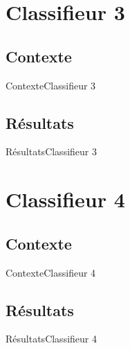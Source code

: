 \documentclass[usenames,dvipsnames]{beamer}
\begin{document}
\section{Classifieur 3}
\subsection{Contexte}
\begin{frame}{Contexte}{Classifieur 3}
\end{frame}

\subsection{Résultats}
\begin{frame}{Résultats}{Classifieur 3}
\end{frame}

\section{Classifieur 4}
\subsection{Contexte}
\begin{frame}{Contexte}{Classifieur 4}
\end{frame}

\subsection{Résultats}
\begin{frame}{Résultats}{Classifieur 4}
\end{frame}
\end{document}
